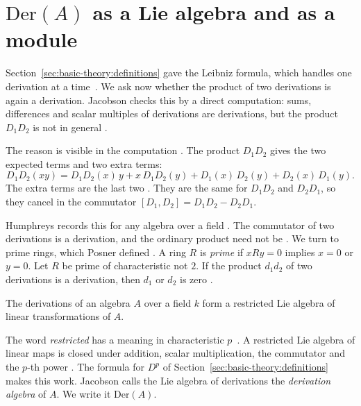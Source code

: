 \section[$\mathrm{Der}(A)$ as a Lie algebra and as a module][Derivations as a Lie algebra]{$\mathrm{Der}(A)$ as a Lie algebra and as a module}\label{sec:basic-theory:der-as-lie-algebra}

Section~\ref{sec:basic-theory:definitions} gave the Leibniz formula, which
handles one derivation at a time~\cite[p.~207]{Jacobson1937}. We ask now whether the product of two
derivations is again a derivation. Jacobson checks this by a direct
computation: sums, differences and scalar multiples of derivations are
derivations, but the product $D_1D_2$ is not in general
\cite[p.~207]{Jacobson1937}.

The reason is visible in the computation \cite[p.~207]{Jacobson1937}. The product $D_1D_2$ gives the two
expected terms and two extra terms:
\[
D_1D_2(xy) = D_1D_2(x)\,y + x\,D_1D_2(y) + D_1(x)\,D_2(y) + D_2(x)\,D_1(y).
\]
The extra terms are the last two \cite[formula~(5), p.~207]{Jacobson1937}. They
are the same for $D_1D_2$ and $D_2D_1$, so they cancel in the commutator
$[D_1,D_2] = D_1D_2 - D_2D_1$.

Humphreys records this for any algebra over a field \cite[\S1.3,
p.~4]{Humphreys1972}. The commutator of two derivations is a derivation, and
the ordinary product need not be \cite[\S1.3, p.~4]{Humphreys1972}. We turn to
prime rings, which Posner defined \cite[p.~1093]{Posner1957}. A ring $R$ is
\emph{prime} if $xRy = 0$ implies $x = 0$ or $y = 0$. Let $R$ be prime of
characteristic not $2$. If the product $d_1d_2$ of two derivations is a
derivation, then $d_1$ or $d_2$ is zero \cite[Theorem~1, p.~1094]{Posner1957}.

\begin{theorem}\label{thm:basic:jacobson-lie}
The derivations of an algebra $A$ over a field $k$ form a restricted Lie
algebra of linear transformations of $A$.
\end{theorem}

The word \emph{restricted} has a meaning in characteristic $p$~\cite[p.~207]{Jacobson1937}. A restricted
Lie algebra of linear maps is closed under addition, scalar multiplication,
the commutator and the $p$-th power \cite[p.~207]{Jacobson1937}. The formula
for $D^p$ of Section~\ref{sec:basic-theory:definitions} makes this work.
Jacobson calls the Lie algebra of derivations the \emph{derivation algebra} of
$A$. We write it $\mathrm{Der}(A)$.

